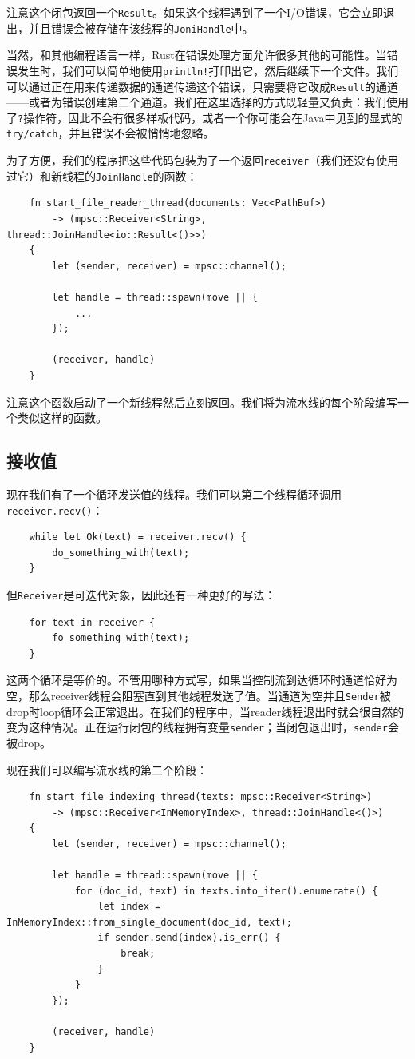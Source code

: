注意这个闭包返回一个\texttt{Result}。如果这个线程遇到了一个I/O错误，它会立即退出，并且错误会被存储在该线程的\texttt{JoniHandle}中。

当然，和其他编程语言一样，Rust在错误处理方面允许很多其他的可能性。当错误发生时，我们可以简单地使用\texttt{println!}打印出它，然后继续下一个文件。我们可以通过正在用来传递数据的通道传递这个错误，只需要将它改成\texttt{Result}的通道——或者为错误创建第二个通道。我们在这里选择的方式既轻量又负责：我们使用了\texttt{?}操作符，因此不会有很多样板代码，或者一个你可能会在Java中见到的显式的\texttt{try/catch}，并且错误不会被悄悄地忽略。

为了方便，我们的程序把这些代码包装为了一个返回\texttt{receiver}（我们还没有使用过它）和新线程的\texttt{JoinHandle}的函数：
\begin{verbatim}
    fn start_file_reader_thread(documents: Vec<PathBuf>)
        -> (mpsc::Receiver<String>, thread::JoinHandle<io::Result<()>>)
    {
        let (sender, receiver) = mpsc::channel();

        let handle = thread::spawn(move || {
            ...
        });

        (receiver, handle)
    }
\end{verbatim}

注意这个函数启动了一个新线程然后立刻返回。我们将为流水线的每个阶段编写一个类似这样的函数。

\subsection{接收值}
现在我们有了一个循环发送值的线程。我们可以第二个线程循环调用\texttt{receiver.recv()}：
\begin{verbatim}
    while let Ok(text) = receiver.recv() {
        do_something_with(text);
    }
\end{verbatim}

但\texttt{Receiver}是可迭代对象，因此还有一种更好的写法：
\begin{verbatim}
    for text in receiver {
        fo_something_with(text);
    }
\end{verbatim}

这两个循环是等价的。不管用哪种方式写，如果当控制流到达循环时通道恰好为空，那么receiver线程会阻塞直到其他线程发送了值。当通道为空并且\texttt{Sender}被drop时loop循环会正常退出。在我们的程序中，当reader线程退出时就会很自然的变为这种情况。正在运行闭包的线程拥有变量\texttt{sender}；当闭包退出时，\texttt{sender}会被drop。

现在我们可以编写流水线的第二个阶段：
\begin{verbatim}
    fn start_file_indexing_thread(texts: mpsc::Receiver<String>)
        -> (mpsc::Receiver<InMemoryIndex>, thread::JoinHandle<()>)
    {
        let (sender, receiver) = mpsc::channel();

        let handle = thread::spawn(move || {
            for (doc_id, text) in texts.into_iter().enumerate() {
                let index = InMemoryIndex::from_single_document(doc_id, text);
                if sender.send(index).is_err() {
                    break;
                }
            }
        });

        (receiver, handle)
    }
\end{verbatim}

